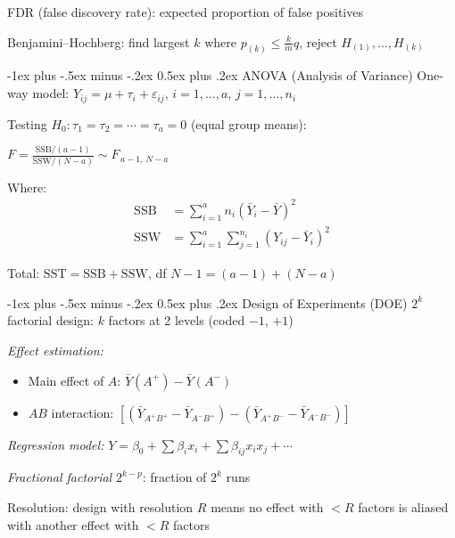 \documentclass[6pt, landscape]{article}
\makeatletter
\renewcommand{\section}{\@startsection{section}{1}{0mm}%
                                {-1ex plus -.5ex minus -.2ex}%
                                {0.5ex plus .2ex}%
                                {\normalfont\bfseries}}
\newcommand{\keyformula}[1]{%
    \begin{tcolorbox}[colback=blue!5,colframe=blue!40!black,boxrule=0.5pt,arc=1pt,fontupper=\scriptsize]
        #1
    \end{tcolorbox}
}
\makeatother
\begin{document}
\begin{multicols}{3}
        FDR (false discovery rate): expected proportion of false positives

        Benjamini–Hochberg: find largest $k$ where $p_{(k)} \le \frac{k}{m}q$, reject $H_{(1)},\dots,H_{(k)}$

        \section{ANOVA (Analysis of Variance)}
        One-way model: $Y_{ij} = \mu + \tau_i + \varepsilon_{ij}$, $i=1,\dots,a$, $j=1,\dots,n_i$

        Testing $H_0: \tau_1=\tau_2=\cdots=\tau_a=0$ (equal group means):
        \keyformula{$F = \frac{\mathrm{SSB}/(a-1)}{\mathrm{SSW}/(N-a)} \sim F_{\,a-1,\,N-a}$}

        Where:
        \begin{align*}
                \mathrm{SSB} & = \sum_{i=1}^a n_i (\bar{Y}_i - \bar{Y})^2         \\
                \mathrm{SSW} & = \sum_{i=1}^a\sum_{j=1}^{n_i}(Y_{ij}-\bar{Y}_i)^2
        \end{align*}

        Total: $\mathrm{SST}=\mathrm{SSB}+\mathrm{SSW}$, df $N-1=(a-1)+(N-a)$

        \section{Design of Experiments (DOE)}
        $2^k$ factorial design: $k$ factors at 2 levels (coded $-1$, $+1$)

        \textit{Effect estimation:}
        \begin{itemize}[leftmargin=*,topsep=0pt,itemsep=0pt]
                \item Main effect of $A$: $\bar{Y}(A^+) - \bar{Y}(A^-)$
                \item $AB$ interaction: $[(\bar{Y}_{A^+B^+}-\bar{Y}_{A^-B^+}) - (\bar{Y}_{A^+B^-}-\bar{Y}_{A^-B^-})]$
        \end{itemize}

        \textit{Regression model:} $Y = \beta_0 + \sum \beta_i x_i + \sum \beta_{ij}x_i x_j + \cdots$

        \textit{Fractional factorial} $2^{k-p}$: fraction of $2^k$ runs

        Resolution: design with resolution $R$ means no effect with $<R$ factors is aliased with another effect with $<R$ factors
\end{multicols}
\end{document}
